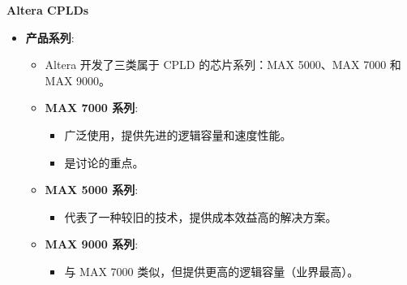 \documentclass[
  ignorenonframetext,
  chinese,
]{beamer}
\providecommand{\tightlist}{%
  \setlength{\itemsep}{0pt}\setlength{\parskip}{0pt}}
\begin{document}
\begin{frame}
\begin{block}{\textbf{Altera CPLDs}}
\label{altera-cplds}
\begin{itemize}
\tightlist
\item
  \textbf{产品系列}:

  \begin{itemize}
  \tightlist
  \item
    Altera 开发了三类属于 CPLD 的芯片系列：MAX 5000、MAX 7000 和 MAX
    9000。
  \item
    \textbf{MAX 7000 系列}:

    \begin{itemize}
    \tightlist
    \item
      广泛使用，提供先进的逻辑容量和速度性能。
    \item
      是讨论的重点。
    \end{itemize}
  \item
    \textbf{MAX 5000 系列}:

    \begin{itemize}
    \tightlist
    \item
      代表了一种较旧的技术，提供成本效益高的解决方案。
    \end{itemize}
  \item
    \textbf{MAX 9000 系列}:

    \begin{itemize}
    \tightlist
    \item
      与 MAX 7000 类似，但提供更高的逻辑容量（业界最高）。
    \end{itemize}
  \end{itemize}
\end{itemize}
\end{block}
\end{frame}
\end{document}
